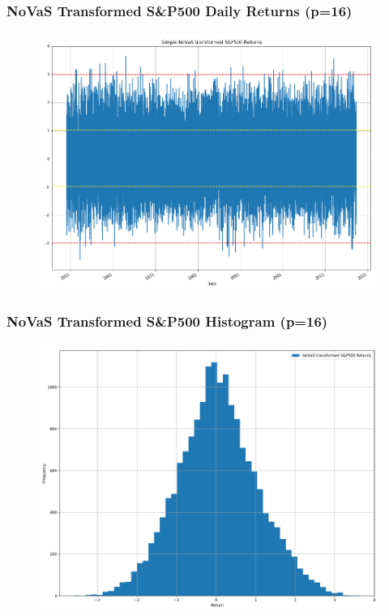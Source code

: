 \documentclass{beamer}
\begin{document}
\begin{frame}
\frametitle{NoVaS Transformed S\&P500 Daily Returns (p=16)}
\begin{figure}[h!]
\centering 
\includegraphics[width=\textwidth]{novas_sp500_returns.png}
\end{figure}
\end{frame}

\begin{frame}
\frametitle{NoVaS Transformed S\&P500 Histogram (p=16)}
\begin{figure}[h!]
\includegraphics[width=\textwidth]{novas_sp500_returns_hist.png}
\end{figure}
\end{frame}
\end{document}
